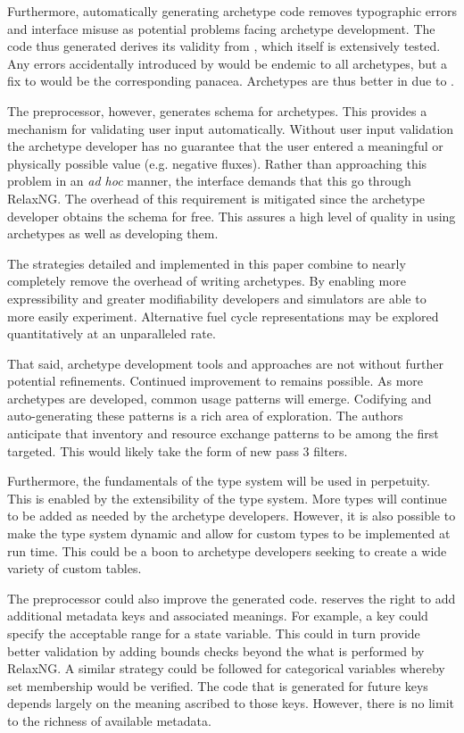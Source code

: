 Furthermore, automatically generating archetype code removes typographic errors and 
\cyclus interface misuse as potential problems facing archetype development. The 
code thus generated derives its validity from \cycpp, which itself is extensively 
tested. Any errors accidentally introduced by \cycpp would be endemic to all archetypes, 
but a fix to \cycpp would be the corresponding panacea. Archetypes are thus 
better in \cyclus due to \cycpp.

The preprocessor, however, generates schema for archetypes. This provides a mechanism 
for validating user input automatically.  Without user input validation the archetype 
developer has no guarantee that the user entered a meaningful or physically possible 
value (e.g. negative fluxes). Rather than approaching this problem in an \emph{ad hoc}
manner, the \cyclus interface demands that this go through RelaxNG.  The overhead 
of this requirement is mitigated since the archetype developer obtains the schema
for free. This assures a high level of quality in using archetypes as well as 
developing them.

The strategies detailed and implemented in this paper combine to nearly completely 
remove the overhead of writing archetypes. By enabling more expressibility and greater
modifiability developers and simulators are able to more easily experiment.  
Alternative fuel cycle representations may be explored quantitatively at an
unparalleled rate.

That said, archetype development tools and approaches are not without further 
potential refinements. Continued improvement to \cycpp remains possible. As more 
archetypes are developed, common usage patterns will emerge. Codifying and 
auto-generating these patterns is a rich area of exploration. The authors anticipate 
that inventory and resource exchange patterns to be among the first targeted.
This would likely take the form of new pass 3 filters.

Furthermore, the fundamentals of the \cyclus type system will be used in perpetuity.
This is enabled by the extensibility of the type system.  More types will continue to 
be added as needed by the archetype developers.  However, it is also possible to 
make the type system dynamic and allow for custom types to be implemented at run time.
This could be a boon to archetype developers seeking to create a wide variety of custom
tables.

The preprocessor could also improve the generated code. \Cyclus reserves the right
to add additional metadata keys and associated meanings.  For example, a 
key could specify the acceptable range for a state variable. This could in turn 
provide better validation by adding bounds checks beyond the what is performed
by RelaxNG. A similar strategy could be followed for categorical variables whereby
set membership would be verified. The code that is generated for future keys 
depends largely on the meaning ascribed to those keys. However, there is no limit 
to the richness of available metadata.

